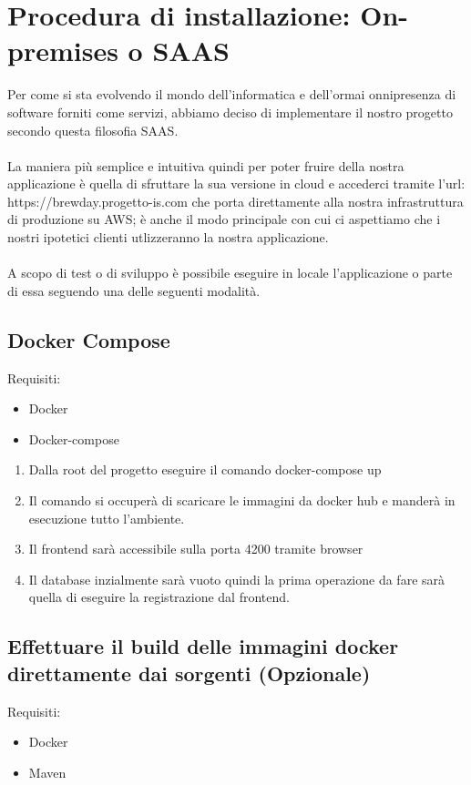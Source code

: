 \documentclass{article}
\begin{document}
\section{Procedura di installazione: On-premises o SAAS}
Per come si sta evolvendo il mondo dell’informatica e dell’ormai onnipresenza di software forniti come servizi, abbiamo deciso di implementare il nostro progetto secondo questa filosofia SAAS.\\
\\
La maniera più semplice e intuitiva quindi per poter fruire della nostra applicazione è quella di sfruttare la sua versione in cloud e accederci tramite l’url: https://brewday.progetto-is.com che porta direttamente alla nostra infrastruttura di produzione su AWS; è anche il modo principale con cui ci aspettiamo che i nostri ipotetici clienti utlizzeranno la nostra applicazione.\\
\\
A scopo di test o di sviluppo è possibile eseguire in locale l’applicazione o parte di essa seguendo una delle seguenti modalità.
\subsection{Docker Compose}
Requisiti:
\begin{itemize}
\item Docker
\item Docker-compose
\end{itemize}
\begin{enumerate}
    \item Dalla root del progetto eseguire il comando docker-compose up
    \item Il comando si occuperà di scaricare le immagini da docker hub e manderà in esecuzione tutto l’ambiente.
    \item Il frontend sarà accessibile sulla porta 4200 tramite browser
    \item Il database inzialmente sarà vuoto quindi la prima operazione da fare sarà quella di eseguire la registrazione dal frontend.
\end{enumerate}
\subsection{Effettuare il build delle immagini docker direttamente dai sorgenti (Opzionale)}
Requisiti: 
\begin{itemize}
    \item Docker
    \item Maven
\end{itemize}
\end{document}
